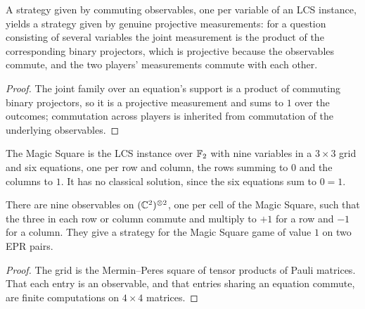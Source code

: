 \begin{lemma}
\label{lem:observable-strategy}
\leanok
A strategy given by commuting observables, one per variable of an LCS instance, yields a
strategy given by genuine projective measurements: for a question consisting of several
variables the joint measurement is the product of the corresponding binary projectors,
which is projective because the observables commute, and the two players' measurements
commute with each other.
\end{lemma}

\begin{proof}
\leanok
The joint family over an equation's support is a product of commuting binary projectors,
so it is a projective measurement and sums to $1$ over the outcomes; commutation across
players is inherited from commutation of the underlying observables.
\end{proof}

\begin{definition}
\label{def:magic-square}
\leanok
The Magic Square is the LCS instance over $\mathbb{F}_2$ with nine variables in a $3 \times 3$
grid and six equations, one per row and column, the rows summing to $0$ and the columns to
$1$. It has no classical solution, since the six equations sum to $0 = 1$.
\end{definition}

\begin{lemma}
\label{lem:mermin-peres}
\leanok
There are nine observables on $(\mathbb{C}^2)^{\otimes 2}$, one per cell of the Magic Square, such
that the three in each row or column commute and multiply to $+1$ for a row and $-1$ for a
column. They give a strategy for the Magic Square game of value $1$ on two EPR pairs.
\end{lemma}

\begin{proof}
\leanok
The grid is the Mermin--Peres square of tensor products of Pauli matrices. That each entry
is an observable, and that entries sharing an equation commute, are finite computations on
$4 \times 4$ matrices.
\end{proof}

